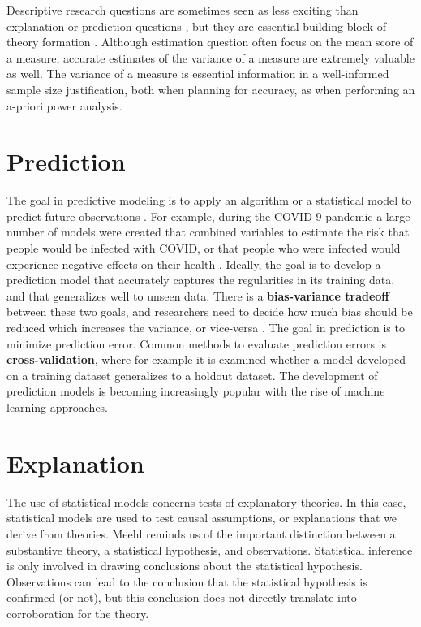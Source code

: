\documentclass[
  oneside]{krantz}
\begin{document}
Descriptive research questions are sometimes seen as less exciting than explanation or prediction questions \citep{gerring_mere_2012}, but they are essential building block of theory formation \citep{scheel_why_2021}. Although estimation question often focus on the mean score of a measure, accurate estimates of the variance of a measure are extremely valuable as well. The variance of a measure is essential information in a well-informed sample size justification, both when planning for accuracy, as when performing an a-priori power analysis.

\hypertarget{prediction}{%
\section{Prediction}\label{prediction}}

The goal in predictive modeling is to apply an algorithm or a statistical model to predict future observations \citep{shmueli_explain_2010}. For example, during the COVID-9 pandemic a large number of models were created that combined variables to estimate the risk that people would be infected with COVID, or that people who were infected would experience negative effects on their health \citep{wynants_prediction_2020}. Ideally, the goal is to develop a prediction model that accurately captures the regularities in its training data, and that generalizes well to unseen data. There is a \textbf{bias-variance tradeoff} between these two goals, and researchers need to decide how much bias should be reduced which increases the variance, or vice-versa \citep{yarkoni_choosing_2017}. The goal in prediction is to minimize prediction error. Common methods to evaluate prediction errors is \textbf{cross-validation}, where for example it is examined whether a model developed on a training dataset generalizes to a holdout dataset. The development of prediction models is becoming increasingly popular with the rise of machine learning approaches.

\hypertarget{explanation}{%
\section{Explanation}\label{explanation}}

The use of statistical models concerns tests of explanatory theories. In this case, statistical models are used to test causal assumptions, or explanations that we derive from theories.
Meehl \citeyearpar{meehl_appraising_1990} reminds us of the important distinction between a substantive theory, a statistical hypothesis, and observations. Statistical inference is only involved in drawing conclusions about the statistical hypothesis. Observations can lead to the conclusion that the statistical hypothesis is confirmed (or not), but this conclusion does not directly translate into corroboration for the theory.
\end{document}

